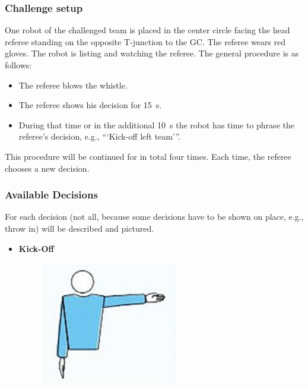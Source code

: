     \subsubsection{Challenge setup}

        One robot of the challenged team is placed in the center circle facing the head referee standing on the opposite T-junction to the GC. The referee wears red gloves. The robot is listing and watching the referee. The general procedure is as follows:

        \begin{itemize}
            \item The referee blows the whistle.
            \item The referee shows his decision for \qty{15}{\second}.
            \item During that time or in the additional \qty{10}{\second} the robot has time to phrase the referee's decision, e.g., ```Kick-off left team'''. 
        \end{itemize}

        This procedure will be continued for in total four times. Each time, the referee chooses a new decision.

    \subsubsection{Available Decisions}

        For each decision (not all, because some decisions have to be shown on place, e.g., throw in) will be described and pictured.

        \begin{itemize}
            \item \textbf{Kick-Off}
            \begin{figure}[ht!]
                \includegraphics{figs/kick-off_referee.jpg}
            \end{figure}
        \end{itemize}

